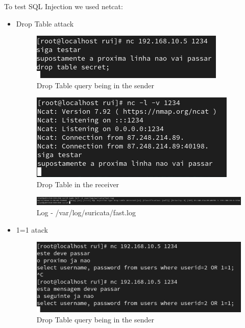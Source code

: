 \documentclass{article}
\begin{document}
To test SQL Injection we used netcat:\par
\begin{itemize}
    \item Drop Table attack\par

\texttt{}\par
\begin{figure}[H]
    \centering
    \includegraphics[scale=0.5]{suricata/sur_sqli_drop_table_external.png}
    \caption{Drop Table query being in the sender}
    \label{fig:network-arc}
\end{figure}


\texttt{}\par
\begin{figure}[H]
    \centering
    \includegraphics[scale=0.5]{suricata/sur_sqli_drop_table_internal.png}
    \caption{Drop Table in the receiver}
    \label{fig:network-arc}
\end{figure}


\texttt{}\par
\begin{figure}[H]
    \centering
    \includegraphics[scale=0.45]{suricata/sur_sqli_drop_table_log.png}
    \caption{Log - /var/log/suricata/fast.log}
    \label{fig:network-arc}
\end{figure}


\item 1=1 atack\par

\texttt{}\par
\begin{figure}[H]
    \centering
    \includegraphics[scale=0.5]{suricata/sur_sqli_1eq1_external.png}
    \caption{Drop Table query being in the sender}
    \label{fig:network-arc}
\end{figure}



\end{itemize}
\end{document}
